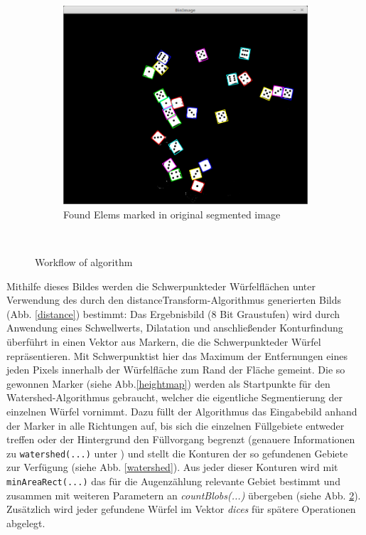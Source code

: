 \documentclass{../Vorlage/sebDenCls}
\begin{document}
\begin{figure}[htp]
\begin{subfigure}{\textwidth}
	\centering
	\includegraphics[width=.7\textwidth]{blobAreas} 
	\caption{Found Elems marked in original segmented image\label{result}}
\end{subfigure}\\
  \caption{Workflow of algorithm}
\end{figure}


Mithilfe dieses Bildes werden die \glqq Schwerpunkte\grqq  der Würfelflächen unter Verwendung des durch den distanceTransform-Algorithmus generierten Bilds (Abb. \ref{distance}) bestimmt: Das Ergebnisbild (8 Bit Graustufen) wird durch Anwendung eines Schwellwerts, Dilatation und anschließender Konturfindung überführt in einen Vektor aus Markern, die die \glqq Schwerpunkte\grqq  der Würfel repräsentieren. Mit \glqq Schwerpunkt\grqq  ist hier das Maximum der Entfernungen eines jeden Pixels innerhalb der Würfelfläche zum Rand der Fläche gemeint. 
Die so gewonnen Marker (siehe Abb.\ref{heightmap})  werden als Startpunkte für den Watershed-Algorithmus gebraucht, welcher die eigentliche Segmentierung der einzelnen Würfel vornimmt. Dazu füllt der Algorithmus das Eingabebild anhand der Marker in alle Richtungen auf, bis sich die einzelnen Füllgebiete entweder treffen oder der Hintergrund den Füllvorgang begrenzt (genauere Informationen zu \texttt{watershed(...)} unter \cite{opCV15}) und stellt die Konturen der so gefundenen Gebiete zur Verfügung (siehe Abb. \ref{watershed}). 
Aus jeder dieser Konturen wird mit\texttt{ minAreaRect(...)} das für die Augenzählung relevante Gebiet bestimmt und zusammen mit weiteren Parametern an \emph{countBlobs(...)} übergeben (siehe Abb. \ref{result}). Zusätzlich wird jeder gefundene Würfel im Vektor \emph{dices} für spätere Operationen abgelegt.
\end{document}
